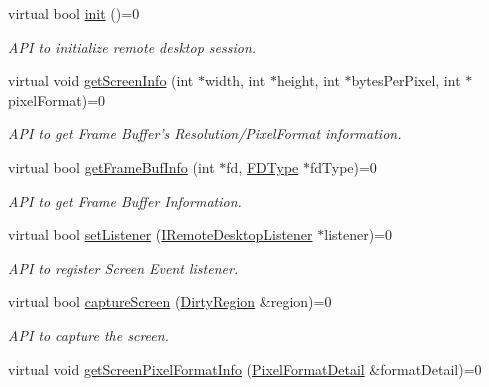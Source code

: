 \begin{DoxyCompactItemize}
\item 
virtual bool \hyperlink{classandroid_1_1IRemoteDesktop_a5792cf8c7fa9eeb8e21f39927d0fed1e}{init} ()=0
\begin{DoxyCompactList}\small\item\em \-A\-P\-I to initialize remote desktop session. \end{DoxyCompactList}\item 
virtual void \hyperlink{classandroid_1_1IRemoteDesktop_ad3727f82980e02999270c033e816b154}{get\-Screen\-Info} (int $\ast$width, int $\ast$height, int $\ast$bytes\-Per\-Pixel, int $\ast$pixel\-Format)=0
\begin{DoxyCompactList}\small\item\em \-A\-P\-I to get \-Frame \-Buffer's \-Resolution/\-Pixel\-Format information. \end{DoxyCompactList}\item 
virtual bool \hyperlink{classandroid_1_1IRemoteDesktop_a684fcd14561744487bbc0b74a1e11ddb}{get\-Frame\-Buf\-Info} (int $\ast$fd, \hyperlink{namespaceandroid_a40f45e8c93a87251c417d8cefdd60fe2}{\-F\-D\-Type} $\ast$fd\-Type)=0
\begin{DoxyCompactList}\small\item\em \-A\-P\-I to get \-Frame \-Buffer \-Information. \end{DoxyCompactList}\item 
virtual bool \hyperlink{classandroid_1_1IRemoteDesktop_a65c43b7be3fa4210a7e0176a0d928955}{set\-Listener} (\hyperlink{classandroid_1_1IRemoteDesktopListener}{\-I\-Remote\-Desktop\-Listener} $\ast$listener)=0
\begin{DoxyCompactList}\small\item\em \-A\-P\-I to register \-Screen \-Event listener. \end{DoxyCompactList}\item 
virtual bool \hyperlink{classandroid_1_1IRemoteDesktop_af777e36a552194cf99e603351259b568}{capture\-Screen} (\hyperlink{classandroid_1_1DirtyRegion}{\-Dirty\-Region} \&region)=0
\begin{DoxyCompactList}\small\item\em \-A\-P\-I to capture the screen. \end{DoxyCompactList}\item 
virtual void \hyperlink{classandroid_1_1IRemoteDesktop_a82aa8e2b0f330e519ea9a03f8cf56831}{get\-Screen\-Pixel\-Format\-Info} (\hyperlink{structandroid_1_1PixelFormatDetail}{\-Pixel\-Format\-Detail} \&format\-Detail)=0

\end{DoxyCompactItemize}
